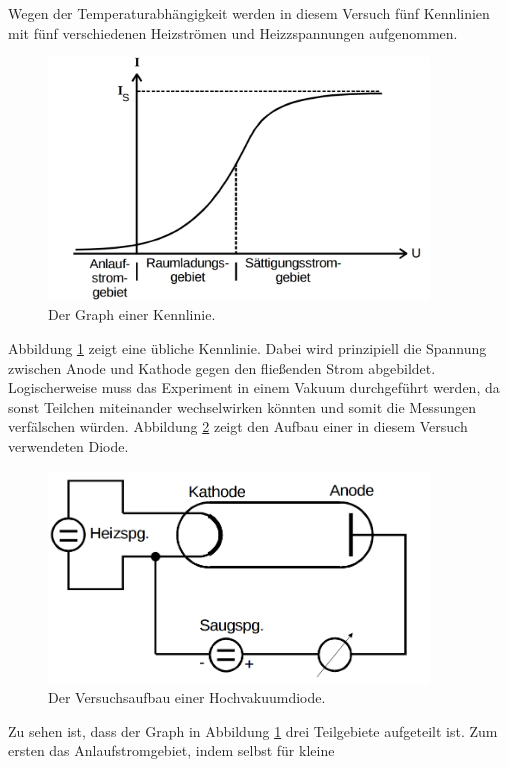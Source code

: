 \documentclass[
  bibliography=totoc,     %
  captions=tableheading,  %
  titlepage=firstiscover, %
]{scrartcl}
\begin{document}
\noindent
Wegen der Temperaturabhängigkeit werden in diesem Versuch fünf Kennlinien
mit fünf verschiedenen Heizströmen und Heizzspannungen aufgenommen.
\begin{figure}[htb]
  \centering
  \includegraphics[width=0.9\textwidth]{V5044.png}
  \caption{Der Graph einer Kennlinie. \cite{anleitung}}
  \label{fig:V5044}
\end{figure}
\noindent
Abbildung \ref{fig:V5044} zeigt eine übliche Kennlinie. Dabei wird prinzipiell
die Spannung zwischen Anode und Kathode gegen den fließenden Strom abgebildet.
Logischerweise muss das Experiment in einem Vakuum durchgeführt werden, da sonst
Teilchen miteinander wechselwirken könnten und somit die Messungen verfälschen
würden. Abbildung \ref{fig:V5045} zeigt den Aufbau einer in diesem Versuch verwendeten Diode.
\begin{figure}[H]
  \centering
  \includegraphics[width=0.9\textwidth]{V5045.png}
  \caption{Der Versuchsaufbau einer Hochvakuumdiode. \cite{anleitung}}
  \label{fig:V5045}
\end{figure}
\noindent
Zu sehen ist, dass der Graph in Abbildung \ref{fig:V5044} drei Teilgebiete
aufgeteilt ist. Zum ersten das Anlaufstromgebiet, indem selbst für kleine
\end{document}
